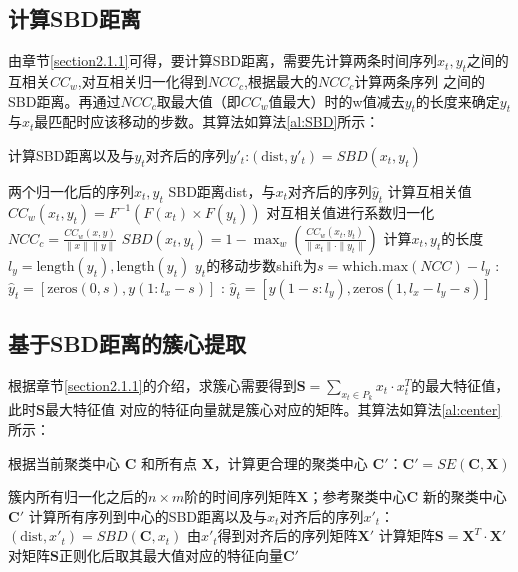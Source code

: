 \subsection{计算SBD距离}
由章节\ref{section2.1.1}可得，要计算SBD距离，需要先计算两条时间序列$x_t,y_t$之间的互相关$CC_w$,对互相关归一化得到$NCC_c$,根据最大的$NCC_c$计算两条序列
之间的SBD距离。再通过$NCC_c$取最大值（即$CC_w$值最大）时的w值减去$y_t$的长度来确定$y_t$与$x_t$最匹配时应该移动的步数。其算法如算法\ref{al:SBD}所示：
\begin{algorithm}[H]
    \caption{计算SBD距离以及与$y_t$对齐后的序列$y'_t$:$(\text{dist}, y'_t) = SBD(x_t, y_t)$}
    \begin{algorithmic}[1]
        \Require 两个归一化后的序列$x_t,y_t$
        \Ensure SBD距离dist，与$x_t$对齐后的序列$\hat{y}_t$
        \State 计算互相关值$CC_w(x_t, y_t) = F^{-1}(F(x_t) \times F(y_t))$%
        \State 对互相关值进行系数归一化$NCC_c = \frac{CC_w(x,y)}{\|x\|\|y\|}$
        \State $SBD(x_t, y_t) = 1 - \max_w \left( \frac{CC_w(x_t, y_t)}{\|x_t\| \cdot \|y_t\|} \right)$
        \State 计算$x_t,y_t$的长度$l_{y} = \text{length}(y_{t}),\text{length}(y_{t})$
        \State $y_t$的移动步数shift为$s = \text{which.max}(NCC) - l_y$
        :
            \State $\hat{y}_t = [\text{zeros}(0,s),y(1:l_x - s)]$
        \Else:
            \State $\hat{y}_t = [y(1 - s:l_y),\text{zeros}(1,l_x - l_y - s)]$
        \EndIf
    \end{algorithmic}
    \label{al:SBD}
\end{algorithm}  
\subsection{基于SBD距离的簇心提取}
根据章节\ref{section2.1.1}的介绍，求簇心需要得到$\mathbf{S} = \sum_{x_t \in P_k} x_t \cdot x_t^T$的最大特征值，此时$\mathbf{S}$最大特征值
对应的特征向量就是簇心对应的矩阵。其算法如算法\ref{al:center}所示：
\begin{algorithm}[H]
    \caption{根据当前聚类中心 $\mathbf{C}$ 和所有点 $\mathbf{X}$，计算更合理的聚类中心 $\mathbf{C'}$：$\mathbf{C'} = SE(\mathbf{C}, \mathbf{X})$}
    \begin{algorithmic}[1]
        \Require 簇内所有归一化之后的$n \times m$阶的时间序列矩阵$\mathbf{X}$；参考聚类中心$\mathbf{C}$
        \Ensure 新的聚类中心$\mathbf{C'}$
            \State 计算所有序列到中心的SBD距离以及与$x_t$对齐后的序列$x'_t$：$(\text{dist}, x'_t) = SBD(\mathbf{C}, x_t)$
            \State 由$x'_t$得到对齐后的序列矩阵$\mathbf{X'}$
        \EndFor
        \State 计算矩阵$\mathbf{S} = \mathbf{X}^T \cdot \mathbf{X}'$
        \State 对矩阵$\mathbf{S}$正则化后取其最大值对应的特征向量$\mathbf{C'}$
    \end{algorithmic}
    \label{al:center}
\end{algorithm}
